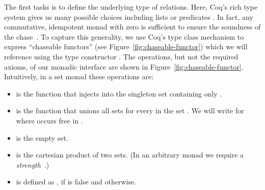 \documentclass[preprint]{sigplanconf}
\newcommand{\greg}[1]{\textcolor{blue}{GREG: #1}}
\begin{document}

The first tasks is to define the underlying type of relations.
Here, Coq's rich type system gives us many possible choices including lists  or predicates .
In fact, any commutative, idempotent monad with zero is sufficient to ensure the soundness of the chase~\cite{Popa99anequational}.
To capture this generality, we use Coq's type class mechanism to express ``chaseable functors'' (see Figure~\ref{fig:chaseable-functor}) which we will reference using the type constructor .
The operations, but not the required axioms, of our monadic interface are shown in Figure~\ref{fig:chaseable-functor}.
Intuitively, in a set monad these operations are:
\begin{itemize}
\item {} is the function that injects  into the singleton set containing only .
\item {} is the function that unions all sets  for every  in the set .  We will write  for  where  occurs free in .
\item {} is the empty set.
\item {} is the cartesian product of two sets.  (In an arbitrary monad we require a {\it strength}~\cite{BW}.)
\item {} is defined as , if  is false and  otherwise.
\end{itemize}
\end{document}
